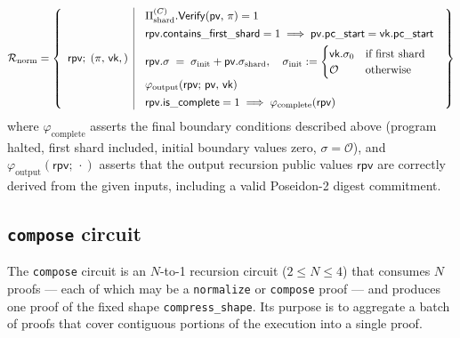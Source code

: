 \documentclass[11pt]{article}
\begin{document}
$$\mathcal{R}_{\mathrm{norm}}=\left\lbrace\begin{array}{c|c}
  \mathsf{rpv}
  ;\;
  (\pi,\,\mathsf{vk},)
  &
  \begin{array}{l}
  \Pi_{\mathrm{shard}}^{(C)}.\mathsf{Verify}(\mathsf{pv},\,\pi)=1\\[4pt]
  \mathsf{rpv}.\mathsf{contains\_first\_shard}=1
    \;\Longrightarrow\;
    \mathsf{pv}.\mathsf{pc\_start}=\mathsf{vk}.\mathsf{pc\_start}\\[4pt]
  \mathsf{rpv}.\sigma \;=\;
    \sigma_{\mathrm{init}} + \mathsf{pv}.\sigma_{\mathrm{shard}},\quad
    \sigma_{\mathrm{init}}:=
    \begin{cases}
      \mathsf{vk}.\sigma_0 & \text{if first shard}\\
      \mathcal{O} & \text{otherwise}
    \end{cases}\\[4pt]
  \varphi_{\mathrm{output}}(\mathsf{rpv};\,\mathsf{pv},\,\mathsf{vk})\\[4pt]
  \mathsf{rpv}.\mathsf{is\_complete}=1
    \;\Longrightarrow\;
    \varphi_{\mathrm{complete}}(\mathsf{rpv})
  \end{array}
\end{array}\right\rbrace$$
where $\varphi_{\mathrm{complete}}$ asserts the final boundary conditions
described above (program halted, first shard included, initial boundary
values zero, $\sigma=\mathcal{O}$),
and $\varphi_{\mathrm{output}}(\mathsf{rpv};\,\cdot)$ asserts that the output
recursion public values $\mathsf{rpv}$ are correctly derived from the given
inputs, including a valid Poseidon-2 digest commitment.

\subsection{\texttt{compose} circuit}\label{sec:compose}

The \texttt{compose} circuit is an $N$-to-1 recursion circuit ($2\leq N\leq 4$)
that consumes $N$ proofs --- each of which may be a \texttt{normalize}
or \texttt{compose} proof --- and produces one proof of
the fixed shape \texttt{compress\_shape}.
Its purpose is to aggregate a batch of proofs that cover
contiguous portions of the execution into a single proof.
\end{document}
